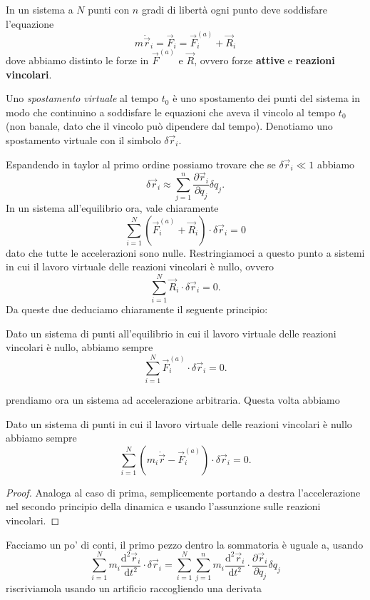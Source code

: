 \documentclass[11pt]{scrartcl}
\newcommand{\dif}{\text{d}}
\newcommand{\posit}{\vec{r}}
\newcommand{\accel}{\ddot{\vec{r}}}
\begin{document}
	In un sistema a $N$ punti con $n$ gradi di libertà ogni punto deve soddisfare l'equazione
	$$m\accel_i=\vec{F}_i=\vec{F}_i^{(a)}+\vec{R}_i$$
	dove abbiamo distinto le forze in $\vec{F}^{(a)}$ e $\vec{R}$, ovvero forze \textbf{attive} e \textbf{reazioni vincolari}.
	\begin{definition}
		Uno \textit{spostamento virtuale} al tempo $t_0$ è uno spostamento dei punti del sistema in modo che continuino a soddisfare le equazioni che aveva il vincolo al tempo $t_0$ (non banale, dato che il vincolo può dipendere dal tempo). Denotiamo uno spostamento virtuale con il simbolo $\delta \posit_i$.
	\end{definition}
	Espandendo in taylor al primo ordine possiamo trovare che se $\delta \posit_i\ll 1$ abbiamo
	$$\delta \posit_i\approx \sum_{j=1}^{n}\frac{\partial \posit_i}{\partial q_j}\delta q_j.$$
	In un sistema all'equilibrio ora, vale chiaramente
	$$\sum_{i=1}^{N}\left(\vec{F}_i^{(a)}+\vec{R}_i\right)\cdot\delta \posit_i=0$$
	dato che tutte le accelerazioni sono nulle. Restringiamoci a questo punto a sistemi in cui il lavoro virtuale delle reazioni vincolari è nullo, ovvero
	$$\sum_{i=1}^{N}\vec{R}_i\cdot\delta \posit_i=0.$$
	Da queste due deduciamo chiaramente il seguente principio:
	\begin{proposition}
		Dato un sistema di punti all'equilibrio in cui il lavoro virtuale delle reazioni vincolari è nullo, abbiamo sempre
		$$\sum_{i=1}^{N}\vec{F}_i^{(a)}\cdot\delta \posit_i=0.$$
	\end{proposition}
	prendiamo ora un sistema ad accelerazione arbitraria. Questa volta abbiamo
	\begin{proposition}
		Dato un sistema di punti in cui il lavoro virtuale delle reazioni vincolari è nullo abbiamo sempre
		$$\sum_{i=1}^{N}\left(m_i\accel-\vec{F}_i^{(a)}\right)\cdot\delta\posit_i=0.$$
	\end{proposition}
	\begin{proof}
		Analoga al caso di prima, semplicemente portando a destra l'accelerazione nel secondo principio della dinamica e usando l'assunzione sulle reazioni vincolari.
	\end{proof}
	Facciamo un po' di conti, il primo pezzo dentro la sommatoria è uguale a, usando  
	$$\sum_{i=1}^{N}m_i\frac{\dif^2\posit_i}{\dif t^2}\cdot\delta\posit_i=\sum_{i=1}^{N}\sum_{j=1}^{n}m_i\frac{\dif^2 \posit_i}{\dif t^2}\cdot\frac{\partial \posit_i}{\partial q_j}\delta q_j$$
	riscriviamola usando un artificio raccogliendo una derivata
\end{document}
